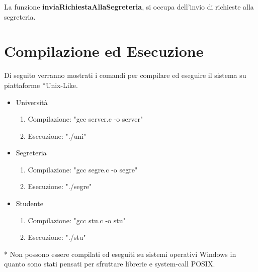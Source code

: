 \documentclass[12pt]{article}
\begin{document}
La funzione \textbf{inviaRichiestaAllaSegreteria}, si occupa dell'invio di richieste alla segreteria.

\newpage

\section{Compilazione ed Esecuzione}
Di seguito verranno mostrati i comandi per compilare ed eseguire il sistema su piattaforme *Unix-Like.
\begin{itemize}
    \item Università
    \begin{enumerate}
        \item Compilazione: "gcc server.c -o server"
        \item Esecuzione: "./uni"\newline
    \end{enumerate}
    \item Segreteria
    \begin{enumerate}
        \item Compilazione: "gcc segre.c -o segre"
        \item Esecuzione: "./segre"\newline
    \end{enumerate}
    \item Studente
    \begin{enumerate}
        \item Compilazione: "gcc stu.c -o stu"
        \item Esecuzione: "./stu"\newline
    \end{enumerate}
\end{itemize}
* Non possono essere compilati ed eseguiti su sistemi operativi Windows in quanto sono stati pensati per sfruttare librerie e system-call POSIX.
\end{document}

